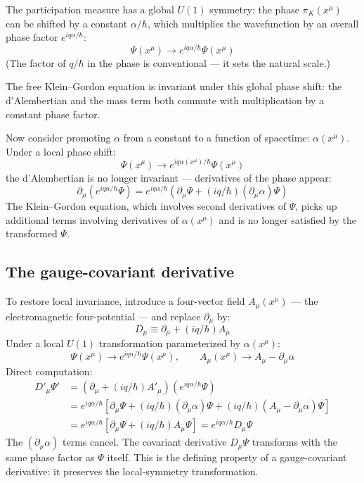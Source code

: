 \documentclass[11pt,a4paper]{article}
\begin{document}
The participation measure has a global $U(1)$ symmetry: the phase $\pi_K(x^\mu)$ can be shifted by a constant $\alpha/\hbar$, which multiplies the wavefunction by an overall phase factor $e^{iq\alpha/\hbar}$:
\[
\Psi(x^\mu) \to e^{iq\alpha/\hbar}\Psi(x^\mu)
\]
(The factor of $q/\hbar$ in the phase is conventional --- it sets the natural scale.)

The free Klein--Gordon equation is invariant under this global phase shift: the d'Alembertian and the mass term both commute with multiplication by a constant phase factor.

Now consider promoting $\alpha$ from a constant to a function of spacetime: $\alpha(x^\mu)$. Under a local phase shift:
\[
\Psi(x^\mu) \to e^{iq\alpha(x^\mu)/\hbar}\Psi(x^\mu)
\]
the d'Alembertian is no longer invariant --- derivatives of the phase appear:
\[
\partial_\mu(e^{iq\alpha/\hbar}\Psi) = e^{iq\alpha/\hbar}(\partial_\mu\Psi + (iq/\hbar)(\partial_\mu\alpha)\Psi)
\]
The Klein--Gordon equation, which involves second derivatives of $\Psi$, picks up additional terms involving derivatives of $\alpha(x^\mu)$ and is no longer satisfied by the transformed $\Psi$.

\subsection{The gauge-covariant derivative}

To restore local invariance, introduce a four-vector field $A_\mu(x^\mu)$ --- the electromagnetic four-potential --- and replace $\partial_\mu$ by:
\[
D_\mu \equiv \partial_\mu + (iq/\hbar)A_\mu
\]
Under a local $U(1)$ transformation parameterized by $\alpha(x^\mu)$:
\[
\Psi(x^\mu) \to e^{iq\alpha/\hbar}\Psi(x^\mu), \qquad A_\mu(x^\mu) \to A_\mu - \partial_\mu\alpha
\]
Direct computation:
\begin{align*}
D'_\mu\Psi' &= (\partial_\mu + (iq/\hbar)A'_\mu)(e^{iq\alpha/\hbar}\Psi) \\
&= e^{iq\alpha/\hbar}[\partial_\mu\Psi + (iq/\hbar)(\partial_\mu\alpha)\Psi + (iq/\hbar)(A_\mu - \partial_\mu\alpha)\Psi] \\
&= e^{iq\alpha/\hbar}[\partial_\mu\Psi + (iq/\hbar)A_\mu\Psi] = e^{iq\alpha/\hbar}D_\mu\Psi
\end{align*}
The $(\partial_\mu\alpha)$ terms cancel. The covariant derivative $D_\mu\Psi$ transforms with the same phase factor as $\Psi$ itself. This is the defining property of a gauge-covariant derivative: it preserves the local-symmetry transformation.
\end{document}
